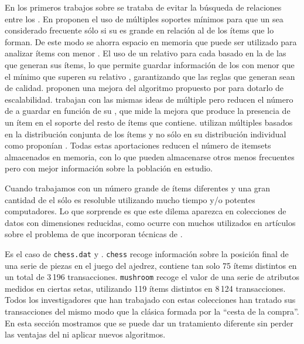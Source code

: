 En los primeros trabajos sobre \ARM se trataba de evitar la búsqueda de relaciones entre los \irs \citep{AgrawalImielinskiSwami-MiningAssociationRulesBetweenSetsOfItemsInLargeDB-1993,AgrawalSrikant-FastAlgorithmsForMiningAssociationRules-1994,ParkChenYu-UsingAHashBasedMethod-1997}. En \citet{LiuHsuMa-ARMWithMultipleMS-1999} proponen el uso de múltiples soportes mínimos para que un \itemset sea considerado frecuente sólo si su \soporte es grande en relación al \soporte de los ítems que lo forman. De este modo se ahorra espacio en memoria que puede ser utilizado para analizar ítems con menor \soporte. El uso de un \soporte relativo para cada \itemset basado en la \confianza de las \ars que generan sus ítems, lo que permite guardar información de los \itemsets con menor \soporte que el \soporte mínimo que superen su \soporte relativo \citep{YunHaHwangRyu-MiningAROnSignificantRareDataUsingRelativeSupport-2003}, garantizando que las reglas que generan sean de calidad. \citet{HuChen-MiningARwithMMS-2006} proponen una mejora del algoritmo propuesto por \citet{LiuHsuMa-ARMWithMultipleMS-1999} para dotarlo de escalabilidad. \citet{TsengLin-EfficientMiningOfAR-2007} trabajan con las mismas ideas de \soporte múltiple pero reducen el número de \itemsets a guardar en función de su \lift, que mide la mejora que produce la presencia de un ítem en el soporte del resto de ítems que contiene. \citet{KiranReddy-ImprovedMultipleMSBasedAppMineRareAR-2009} utilizan múltiples \soportes basados en la distribución conjunta de los ítems y no sólo en su distribución individual como proponían \citet{LiuHsuMa-ARMWithMultipleMS-1999}. Todas estas aportaciones reducen el número de itemsets almacenados en memoria, con lo que pueden almacenarse otros \itemsets menos frecuentes pero con mejor información sobre la población en estudio.

Cuando trabajamos con un número grande de ítems diferentes y una gran cantidad de \transacciones el \dilemaIR sólo es resoluble utilizando mucho tiempo y/o potentes computadores. Lo que sorprende es que este dilema aparezca en colecciones de datos con dimensiones reducidas, como ocurre con muchos \datasets utilizados en artículos sobre el problema de \Clasificacion que incorporan técnicas de \arm.

Es el caso de \texttt{chess.dat} y \mushroom.  \texttt{chess} recoge información sobre la posición final de una serie de piezas en el juego del ajedrez, contiene tan solo 75 ítems distintos en un total de 3\,196 transacciones. \texttt{mushroom} recoge el valor de una serie de atributos medidos en ciertas setas, utilizando 119 ítems distintos en 8\,124 transacciones. Todos los investigadores que han trabajado con estas colecciones han tratado sus transacciones del mismo modo que la clásica \transaccion formada por la "`cesta de la compra"'. En esta sección mostramos que se puede dar un tratamiento diferente sin perder las ventajas del \ARM ni aplicar nuevos algoritmos.
